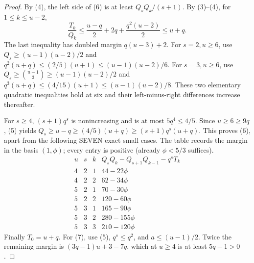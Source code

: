 \begin{proof}
By (4), the left side of (6) is at least
$Q_sQ_k/(s+1)$. By (3)--(4), for $1\le k\le u-2$,
\[
 \frac{T_k}{Q_k}\le
 \frac{u-q}{2}+2q+\frac{q^2(u-2)}2\le u+q.          \tag{8}
\]
The last inequality has doubled margin $q(u-3)+2$.
For $s=2,u\ge6$, use $Q_s\ge(u-1)(u-2)/2$ and
$q^2(u+q)\le(2/5)(u+1)\le(u-1)(u-2)/6$.
For $s=3,u\ge6$, use
$Q_s\ge {u-1\choose3}\ge(u-1)(u-2)/2$ and
$q^3(u+q)\le(4/15)(u+1)\le(u-1)(u-2)/8$.
These two elementary quadratic inequalities hold at six and their
left-minus-right differences increase thereafter.

For $s\ge4$, $(s+1)q^s$ is nonincreasing and is at most
$5q^4\le4/5$. Since $u\ge6\ge9q$, (5) yields
$Q_s\ge u-q\ge(4/5)(u+q)\ge(s+1)q^s(u+q)$.
This proves (6), apart from the following SEVEN exact small cases.
The table records the margin in the basis $(1,\phi)$; every entry
is positive (already $\phi<5/3$ suffices).
\[
\begin{array}{c|c|c|r}
u&s&k&Q_sQ_k-Q_{s+1}Q_{k-1}-q^sT_k\\\hline
4&2&1&44-22\phi\\
4&2&2&62-34\phi\\
5&2&1&70-30\phi\\
5&2&2&120-60\phi\\
5&3&1&165-90\phi\\
5&3&2&280-155\phi\\
5&3&3&210-120\phi
\end{array}
\]
Finally $T_0=u+q$. For (7), use (5), $q^s\le q^2$,
and $a\le(u-1)/2$. Twice the remaining margin is
$(3q-1)u+3-7q$, which at $u\ge4$ is at least $5q-1>0$.
\end{proof}

